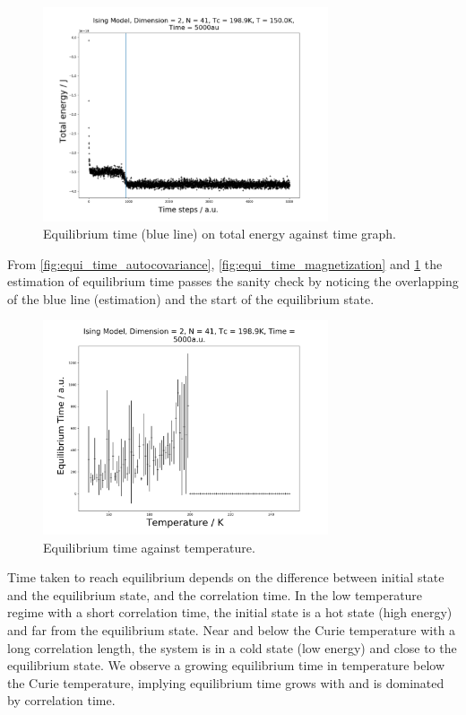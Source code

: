 \documentclass[%
showkeys,
bibnotes,
amsmath,amssymb,
floatfix,
]{revtex4-1}
\begin{document}
\begin{figure}[H] \centering
	\includegraphics[width=0.75\textwidth]{../figures/equi_time_total_energy}
	\caption{\label{fig:equi_time_total_energy} Equilibrium time (blue line) on total energy against time graph.}
\end{figure}

From \ref{fig:equi_time_autocovariance}, \ref{fig:equi_time_magnetization} and \ref{fig:equi_time_total_energy} the estimation of equilibrium time passes the sanity check by noticing the overlapping of the blue line (estimation) and the start of the equilibrium state.

\begin{figure}[H] \centering
	\includegraphics[width=0.75\textwidth]{../figures/equiliibrium_times_vs_temperature}
	\caption{\label{fig:equiliibrium_times_vs_temperature} Equilibrium time against temperature.}
\end{figure}

Time taken to reach equilibrium depends on the difference between initial state and the equilibrium state, and the correlation time. In the low temperature regime with a short correlation time, the initial state is a hot state (high energy) and far from the equilibrium state. Near and below the Curie temperature with a long correlation length, the system is in a cold state (low energy) and close to the equilibrium state. We observe a growing equilibrium time in temperature below the Curie temperature, implying equilibrium time grows with and is dominated by correlation time.
\end{document}
